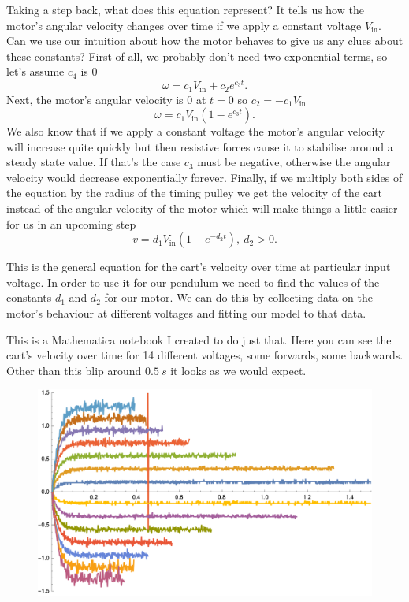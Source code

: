 \documentclass{article}
\begin{document}
Taking a step back, what does this equation represent? It tells us how the motor's angular velocity changes over time if we apply a constant voltage $V_\text{in}$. Can we use our intuition about how the motor behaves to give us any clues about these constants? First of all, we probably don't need two exponential terms, so let's assume $c_4$ is $0$ \[\omega = c_1 V_\text{in} + c_2 e^{c_3 t}.\] Next, the motor's angular velocity is $0$ at $t = 0$ so $c_2 = -c_1 V_\text{in}$ \[\omega = c_1 V_\text{in} (1 - e^{c_3 t}).\] We also know that if we apply a constant voltage the motor's angular velocity will increase quite quickly but then resistive forces cause it to stabilise around a steady state value. If that's the case $c_3$ must be negative, otherwise the angular velocity would decrease exponentially forever. Finally, if we multiply both sides of the equation by the radius of the timing pulley we get the velocity of the cart instead of the angular velocity of the motor which will make things a little easier for us in an upcoming step \[v = d_1 V_\text{in} (1 - e^{-d_2 t}), \ d_2 > 0.\]

This is the general equation for the cart's velocity over time at particular input voltage. In order to use it for our pendulum we need to find the values of the constants $d_1$ and $d_2$ for our motor. We can do this by collecting data on the motor's behaviour at different voltages and fitting our model to that data.

This is a Mathematica notebook I created to do just that. Here you can see the cart's velocity over time for 14 different voltages, some forwards, some backwards. Other than this blip around $\qty{0.5}{s}$ it looks as we would expect.

\begin{figure}[H]
  \centering
  \includegraphics[width=\textwidth]{angular_velocities}
\end{figure}
\end{document}
